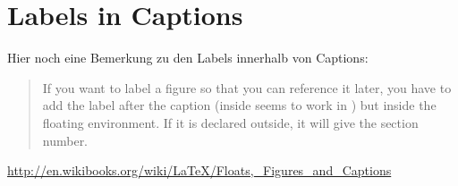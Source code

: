 \documentclass[10pt]{article}
\begin{document}
\section{Labels in Captions}

Hier noch eine Bemerkung zu den Labels innerhalb von Captions:
\begin{quote}
If you want to label a figure so that you can reference it later, you have to add the label after the caption (inside seems to work in \LaTeXe) but inside the floating environment. If it is declared outside, it will give the section number.\end{quote}

\noindent\url{http://en.wikibooks.org/wiki/LaTeX/Floats,_Figures_and_Captions}
\end{document}
